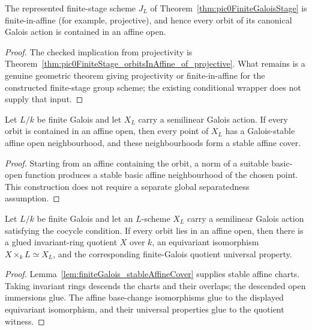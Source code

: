 \begin{theorem}
  \label{thm:pic0FiniteStage_orbitsInAffine}
  \notready
  The represented finite-stage scheme \(J_L\) of
  Theorem~\ref{thm:pic0FiniteGaloisStage} is finite-in-affine (for example, projective), and
  hence every orbit of its canonical Galois action is contained in an affine open.
\end{theorem}
\begin{proof}
  The checked implication from projectivity is
  Theorem~\ref{thm:pic0FiniteStage_orbitsInAffine_of_projective}.  What remains is a genuine
  geometric theorem giving projectivity or finite-in-affine for the constructed finite-stage
  group scheme; the existing conditional wrapper does not supply that input.
\end{proof}

\begin{lemma}
  \label{lem:finiteGalois_stableAffineCover}
  \leanok
  Let \(L/k\) be finite Galois and let \(X_L\) carry a semilinear Galois action.  If every
  orbit is contained in an affine open, then every point of \(X_L\) has a Galois-stable affine
  open neighbourhood, and these neighbourhoods form a stable affine cover.
\end{lemma}
\begin{proof}
  \leanok
  Starting from an affine containing the orbit, a norm of a suitable basic-open function
  produces a stable basic affine neighbourhood of the chosen point.  This construction does
  not require a separate global separatedness assumption.
\end{proof}

\begin{theorem}
  \label{thm:finiteGalois_schemeDescent}
  \leanok
  Let \(L/k\) be finite Galois and let an \(L\)-scheme \(X_L\) carry a semilinear Galois
  action satisfying the cocycle condition.  If every orbit lies in an affine open, then there
  is a glued invariant-ring quotient \(X\) over \(k\), an equivariant isomorphism
  \(X\times_kL\simeq X_L\), and the corresponding finite-Galois quotient universal property.
\end{theorem}
\begin{proof}
  \leanok
  Lemma~\ref{lem:finiteGalois_stableAffineCover} supplies stable affine charts.  Taking
  invariant rings descends the charts and their overlaps; the descended open immersions glue.
  The affine base-change isomorphisms glue to the displayed equivariant isomorphism, and their
  universal properties glue to the quotient witness.
\end{proof}

